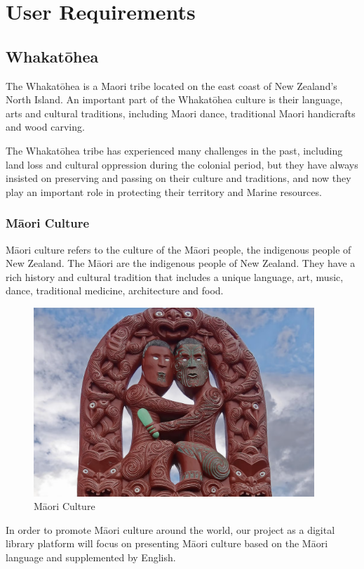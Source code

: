 \chapter{User Requirements}

\section{Whakatōhea}
The Whakatōhea is a Maori tribe located on the east coast of New Zealand's North Island. An important part of the Whakatōhea culture is their language, arts and cultural traditions, including Maori dance, traditional Maori handicrafts and wood carving\cite{AboutUsW69:online}.

The Whakatōhea tribe has experienced many challenges in the past, including land loss and cultural oppression during the colonial period, but they have always insisted on preserving and passing on their culture and traditions, and now they play an important role in protecting their territory and Marine resources\cite{Aboutthi61:online}.

\subsection{Māori Culture}
Māori culture refers to the culture of the Māori people, the indigenous people of New Zealand. The Māori are the indigenous people of New Zealand. They have a rich history and cultural tradition that includes a unique language, art, music, dance, traditional medicine, architecture and food.

\begin{figure}[htbp]
  \centerline{\includegraphics[width=300pt]{images/M1-1.png}}
  \caption{Māori Culture}
\end{figure}

In order to promote Māori culture around the world, our project as a digital library platform will focus on presenting Māori culture based on the Māori language and supplemented by English.

